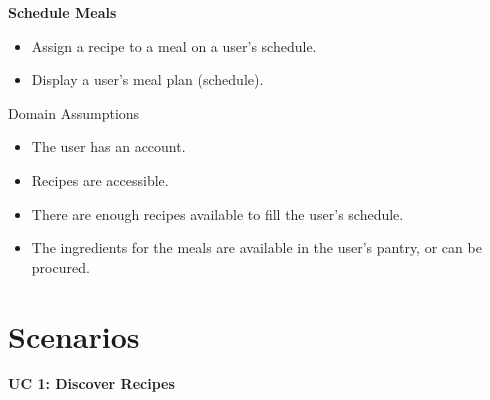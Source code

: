 \documentclass[11pt, letterpaper]{report}
\begin{document}
\noindent \textbf{Schedule Meals}
\begin{itemize}
    \item Assign a recipe to a meal on a user’s schedule.
    \item Display a user’s meal plan (schedule).
\end{itemize}
Domain Assumptions
\begin{itemize}
    \item The user has an account.
    \item Recipes are accessible.
    \item There are enough recipes available to fill the user’s schedule.
    \item The ingredients for the meals are available in the user’s pantry, or can be procured.
\end{itemize}

\chapter{Scenarios}
\noindent \textbf{UC 1: Discover Recipes} \\
\end{document}
